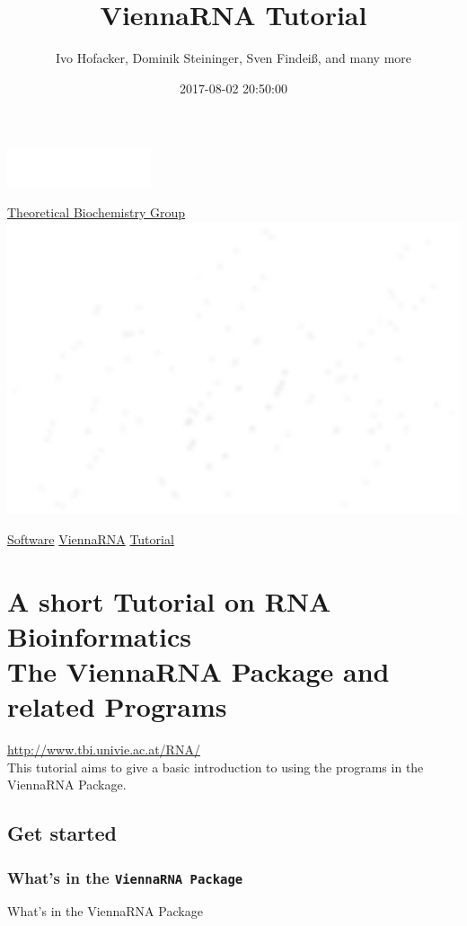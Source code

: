 \documentclass[]{article}
\title{ViennaRNA Tutorial}
\date{2017-08-02 20:50:00}
\author{Ivo Hofacker, Dominik Steininger, Sven Findeiß, and many more}
\begin{document}
\maketitle

\includegraphics{Figs/unilogo_small.png}

\href{http://www.tbi.univie.ac.at/}{Theoretical Biochemistry Group}
\href{https://www.tbi.univie.ac.at/index.html}{\includegraphics{Figs/tbilogo.png}}

\href{https://www.tbi.univie.ac.at/software}{Software}
\href{https://www.tbi.univie.ac.at/RNA/index.html}{ViennaRNA}
\href{https://www.tbi.univie.ac.at/RNA/tutorial/tutorial.html}{Tutorial}

\section{A short Tutorial on RNA Bioinformatics\\
The ViennaRNA Package and related Programs}
\url{http://www.tbi.univie.ac.at/RNA/}\\

This tutorial aims to give a basic introduction to using the programs
in the ViennaRNA Package.

\subsection{Get started}\label{get-started}

\subsubsection{What's in the \texttt{ViennaRNA\ Package}}{What's in the ViennaRNA Package}\label{whats-in-the-viennarna-package}
\end{document}
